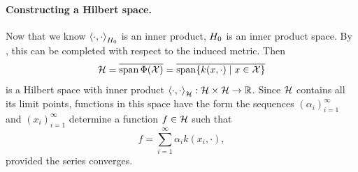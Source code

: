 \paragraph{Constructing a Hilbert space.}
\def\iptH#1{\ipt{#1}_{\H}}
Now that we know \(\left\langle \cdot, \cdot \right\rangle_{H_0}\) is an inner product, \(H_0\) is an inner product space.
By \cite{kreyszig1991introductory}, this can be completed with respect to the induced metric.
Then
\begin{equation}
    \label{eqn:complete-feature-space}
    \mathcal{H}
    = \overline{\operatorname{span} \Phi(\mathcal{X})}
    = \overline{\operatorname{span}\{k(x, \cdot) \mid x \in \mathcal{X}\}}
\end{equation}
is a Hilbert space with inner product \(\iptH{\cdot, \cdot} : \H \times \H \to \RR\).
Since \(\mathcal{H}\) contains all its limit points, functions in this space have the form
the sequences \((\alpha_i)_{i=1}^\infty\) and \((x_i)_{i=1}^\infty\) determine a function \(f \in \mathcal{H}\) such that
\begin{equation}
    f = \sum_{i=1}^{\infty} \alpha_i k(x_i, \cdot),
\end{equation}
provided the series converges.